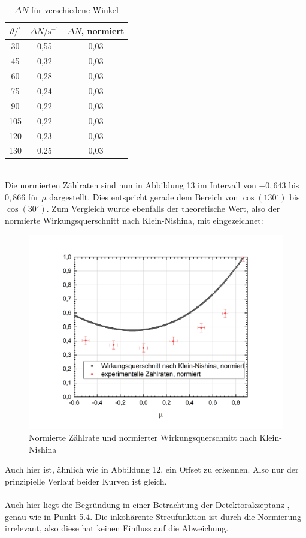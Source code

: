 \documentclass[german,  %
parskip=full,  %
]{scrartcl}
\begin{document}
\begin{table}[h!]\centering
\begin{tabular}{|c|c|c|}\hline
$\vartheta/^{\circ}$ & $\Delta \dot{N}/\text{s}^{-1}$ &  $\Delta \dot{N}$, normiert \\\hline
30   &  0,55 &0,03		\\\hline
45   & 0,32&	0,03	\\\hline
60   &  0,28&0,03	\\\hline
75   &  0,24&0,03	\\\hline
90   & 0,22&0,03	\\\hline
105 & 0,22& 0,03	\\\hline
120 &  0,23&0,03		\\\hline
130 &  0,25&0,03		\\\hline
\end{tabular}
\caption{$\Delta \dot{N}$ für verschiedene Winkel}
\end{table}
\\
Die normierten Zählraten sind nun in Abbildung 13 im Intervall von $-0,643$ bis $0,866$ für $\mu$ dargestellt. Dies entspricht gerade dem Bereich von $\cos(130^{\circ})$ bis $\cos(30^{\circ})$. Zum Vergleich wurde ebenfalls der theoretische Wert, also der normierte Wirkungsquerschnitt nach Klein-Nishina, mit eingezeichnet:
\newpage
\begin{figure}[h!]\centering
\includegraphics[scale=0.5]{wirkungsquerschnitt}
\caption{Normierte Zählrate und normierter Wirkungsquerschnitt nach Klein-Nishina}
\end{figure}
Auch hier ist, ähnlich wie in Abbildung 12, ein Offset zu erkennen. Also nur der prinzipielle Verlauf beider Kurven ist gleich.
\\\\
Auch hier liegt die Begründung in einer Betrachtung der Detektorakzeptanz , genau wie in Punkt 5.4. Die inkohärente Streufunktion ist durch die Normierung irrelevant, also diese hat keinen Einfluss auf die Abweichung.
\end{document}

